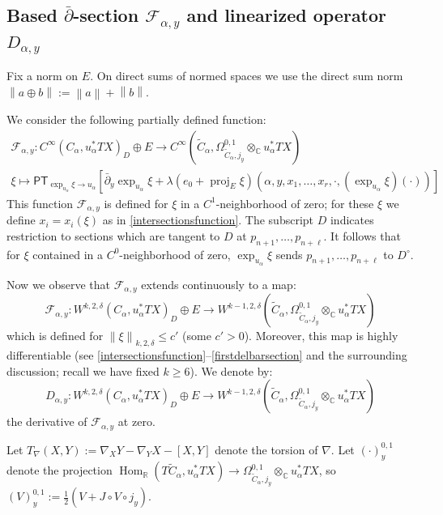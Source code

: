 \documentclass[12pt]{article}
\theoremstyle{definition}
\theoremstyle{remark}
\numberwithin{equation}{subsection}
\newcommand{\F}{\mathcal F}
\newcommand{\CC}{\mathbb C}
\newcommand{\RR}{\mathbb R}
\newcommand{\PT}{\mathsf{PT}}
\newcommand{\proj}{\operatorname{proj}}
\newcommand{\delbar}{\bar\partial}
\newcommand{\Hom}{\operatorname{Hom}}
\begin{document}
\subsection{Based \texorpdfstring{$\delbar$-section}{del bar section} \texorpdfstring{$\F_{\alpha,y}$}{F\_alpha,y} and linearized operator \texorpdfstring{$D_{\alpha,y}$}{D\_alpha,y}}

Fix a norm on $E$.  On direct sums of normed spaces we use the direct sum norm $\left\|a\oplus b\right\|:=\left\|a\right\|+\left\|b\right\|$.

We consider the following partially defined function:
\begin{gather*}%
\mathcal F_{\alpha,y}:C^\infty(C_\alpha,u_\alpha^\ast TX)_D\oplus E\to C^\infty(\tilde C_\alpha,\Omega^{0,1}_{\tilde C_\alpha,j_y}\otimes_\CC u_\alpha^\ast TX)\\
\xi\mapsto\PT_{\exp_{u_\alpha}\xi\to u_\alpha}\left[\delbar_y\exp_{u_\alpha}\xi+\lambda(e_0+\proj_E\xi)(\alpha,y,x_1,\ldots,x_r,\cdot,(\exp_{u_\alpha}\xi)(\cdot))\right]
\end{gather*}
This function $\F_{\alpha,y}$ is defined for $\xi$ in a $C^1$-neighborhood of zero; for these $\xi$ we define $x_i=x_i(\xi)$ as in \eqref{intersectionsfunction}.  The subscript $D$ indicates restriction to sections which are tangent to $D$ at $p_{n+1},\ldots,p_{n+\ell}$.  It follows that for $\xi$ contained in a $C^0$-neighborhood of zero, $\exp_{u_\alpha}\xi$ sends $p_{n+1},\ldots,p_{n+\ell}$ to $D^\circ$.

Now we observe that $\mathcal F_{\alpha,y}$ extends continuously to a map:
\begin{equation}
\mathcal F_{\alpha,y}:W^{k,2,\delta}(C_\alpha,u_\alpha^\ast TX)_D\oplus E\to W^{k-1,2,\delta}(\tilde C_\alpha,\Omega^{0,1}_{\tilde C_\alpha,j_y}\otimes_\CC u_\alpha^\ast TX)
\end{equation}
which is defined for $\left\|\xi\right\|_{k,2,\delta}\leq c'$ (some $c'>0$).  Moreover, this map is highly differentiable (see \eqref{intersectionsfunction}--\eqref{firstdelbarsection} and the surrounding discussion; recall we have fixed $k\geq 6$).  We denote by:
\begin{equation}
D_{\alpha,y}:W^{k,2,\delta}(C_\alpha,u_\alpha^\ast TX)_D\oplus E\to W^{k-1,2,\delta}(\tilde C_\alpha,\Omega^{0,1}_{\tilde C_\alpha,j_y}\otimes_\CC u_\alpha^\ast TX)
\end{equation}
the derivative of $\F_{\alpha,y}$ at zero.

Let $T_\nabla(X,Y):=\nabla_XY-\nabla_YX-[X,Y]$ denote the torsion of $\nabla$.  Let $(\cdot)^{0,1}_y$ denote the projection $\Hom_\RR(T\tilde C_\alpha,u_\alpha^\ast TX)\to\Omega^{0,1}_{\tilde C_\alpha,j_y}\otimes_\CC u_\alpha^\ast TX$, so $(V)^{0,1}_y:=\frac 12(V+J\circ V\circ j_y)$.
\end{document}
